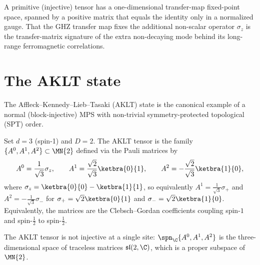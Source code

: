 \begin{remark}
    A primitive (injective) tensor has a one-dimensional transfer-map
    fixed-point space, spanned by a positive matrix that equals the identity only
    in a normalized gauge.  That the GHZ transfer map fixes the additional
    non-scalar operator $\sigma_z$ is the transfer-matrix signature of the extra
    non-decaying mode behind its long-range ferromagnetic correlations.
\end{remark}

\section{The AKLT state}\label{sec:aklt}

The Affleck--Kennedy--Lieb--Tasaki (AKLT) state is the canonical
example of a normal (block-injective) MPS with non-trivial
symmetry-protected topological (SPT) order.

\begin{definition}\label{def:aklt_tensor}
    \leanok
    Set $d = 3$ (spin-1) and $D = 2$. The AKLT tensor is the family
    $\{A^0, A^1, A^2\} \subset \MN{2}$ defined via the Pauli matrices by
    \[
        A^0 = \frac{1}{\sqrt{3}} \sigma_z,
        \qquad
        A^1 = \frac{\sqrt{2}}{\sqrt{3}} \ketbra{0}{1},
        \qquad
        A^2 = -\frac{\sqrt{2}}{\sqrt{3}} \ketbra{1}{0},
    \]
    where
    $\sigma_z = \ketbra{0}{0} - \ketbra{1}{1}$,
    so equivalently $A^1 = \frac{1}{\sqrt{3}} \sigma_+$ and
    $A^2 = -\frac{1}{\sqrt{3}} \sigma_-$ for
    $\sigma_+ = \sqrt{2} \ketbra{0}{1}$ and
    $\sigma_- = \sqrt{2} \ketbra{1}{0}$.
    Equivalently, the matrices are the Clebsch--Gordan coefficients
    coupling spin-$1$ and spin-$\tfrac12$ to spin-$\tfrac12$.
\end{definition}

\begin{theorem}\label{thm:aklt_not_injective}
    \leanok
    The AKLT tensor is not injective at a single site:
    $\spn_{\C}\{A^0, A^1, A^2\}$ is the three-dimensional space of
    traceless matrices $\mathfrak{sl}(2,\C)$, which is a proper
    subspace of~$\MN{2}$.
\end{theorem}

